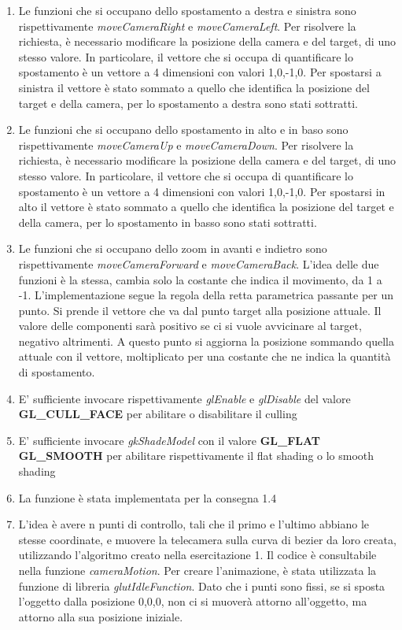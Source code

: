 \begin{enumerate}
\begin{enumerate}
        \item Le funzioni che si occupano dello spostamento a destra e sinistra sono rispettivamente \textit{moveCameraRight} e \textit{moveCameraLeft}.
        Per risolvere la richiesta, è necessario modificare la posizione della camera e del target, di uno stesso valore. In particolare, il vettore che si occupa di quantificare lo spostamento è un vettore a 4 dimensioni con valori 1,0,-1,0. Per spostarsi a sinistra il vettore è stato sommato a quello che identifica la posizione del target e della camera, per lo spostamento a destra sono stati sottratti.
        \item Le funzioni che si occupano dello spostamento in alto e in baso sono rispettivamente \textit{moveCameraUp} e \textit{moveCameraDown}. Per risolvere la richiesta, è necessario modificare la posizione della camera e del target, di uno stesso valore. In particolare, il vettore che si occupa di quantificare lo spostamento è un vettore a 4 dimensioni con valori 1,0,-1,0. Per spostarsi in alto il vettore è stato sommato a quello che identifica la posizione del target e della camera, per lo spostamento in basso sono stati sottratti.
        \item Le funzioni che si occupano dello zoom in avanti e indietro sono rispettivamente \textit{moveCameraForward} e \textit{moveCameraBack}. L'idea delle due funzioni è la stessa, cambia solo la costante che indica il movimento, da 1 a -1. L'implementazione segue la regola della retta parametrica passante per un punto. Si prende il vettore che va dal punto target alla posizione attuale. Il valore delle componenti sarà positivo se ci si vuole avvicinare al target, negativo altrimenti. A questo punto si aggiorna la posizione sommando quella attuale con il vettore, moltiplicato per una costante che ne indica la quantità di spostamento. 
        \item E' sufficiente invocare rispettivamente \textit{glEnable} e \textit{glDisable} del valore \textbf{GL\_CULL\_FACE} per abilitare o disabilitare il culling
        \item E' sufficiente invocare \textit{gkShadeModel} con il valore \textbf{GL\_FLAT} \textbf{GL\_SMOOTH} per abilitare rispettivamente il flat shading o lo smooth shading
        \item La funzione è stata implementata per la consegna 1.4
        \item  L'idea è avere n punti di controllo, tali che il primo e l'ultimo abbiano le stesse coordinate, e muovere la telecamera sulla curva di bezier da loro creata, utilizzando l'algoritmo creato nella esercitazione 1. Il codice è consultabile nella funzione \textit{cameraMotion}. Per creare l'animazione, è stata utilizzata la funzione di libreria \textit{glutIdleFunction}. Dato che i punti sono fissi, se si sposta l'oggetto dalla posizione 0,0,0, non ci si muoverà attorno all'oggetto, ma attorno alla sua posizione iniziale.\\

\end{enumerate}
\end{enumerate}
